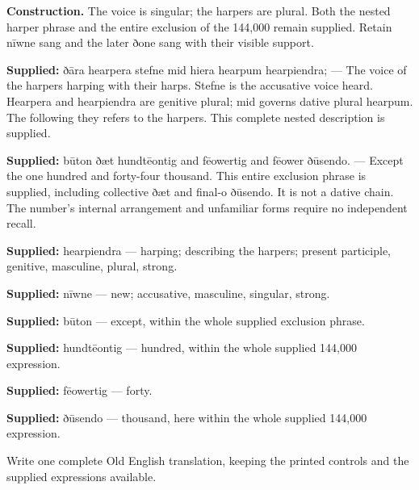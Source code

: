 \textbf{Construction.} The voice is singular; the harpers are plural. Both the nested harper phrase and the entire exclusion of the 144,000 remain supplied. Retain nīwne sang and the later ðone sang with their visible support.

\textbf{Supplied:} ðāra hearpera stefne mid hiera hearpum hearpiendra; — The voice of the harpers harping with their harps. Stefne is the accusative voice heard. Hearpera and hearpiendra are genitive plural; mid governs dative plural hearpum. The following they refers to the harpers. This complete nested description is supplied.

\textbf{Supplied:} būton ðæt hundtēontig and fēowertig and fēower ðūsendo. — Except the one hundred and forty-four thousand. This entire exclusion phrase is supplied, including collective ðæt and final-o ðūsendo. It is not a dative chain. The number’s internal arrangement and unfamiliar forms require no independent recall.

\textbf{Supplied:} hearpiendra — harping; describing the harpers; present participle, genitive, masculine, plural, strong.

\textbf{Supplied:} nīwne — new; accusative, masculine, singular, strong.

\textbf{Supplied:} būton — except, within the whole supplied exclusion phrase.

\textbf{Supplied:} hundtēontig — hundred, within the whole supplied 144,000 expression.

\textbf{Supplied:} fēowertig — forty.

\textbf{Supplied:} ðūsendo — thousand, here within the whole supplied 144,000 expression.

Write one complete Old English translation, keeping the printed controls and the supplied expressions available.

